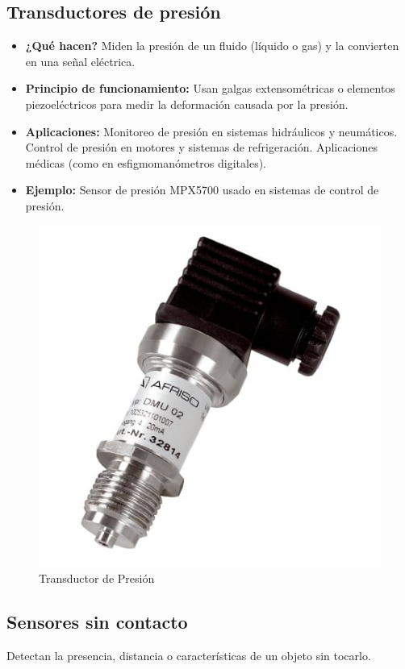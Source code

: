 \subsection*{Transductores de presión}
\begin{itemize}
	\item \textbf{¿Qué hacen?} Miden la presión de un fluido (líquido o gas) y la convierten en una señal eléctrica.
	\item \textbf{Principio de funcionamiento:} Usan galgas extensométricas o elementos piezoeléctricos para medir la deformación causada por la presión.
	\item \textbf{Aplicaciones:} Monitoreo de presión en sistemas hidráulicos y neumáticos.
	Control de presión en motores y sistemas de refrigeración.
	Aplicaciones médicas (como en esfigmomanómetros digitales).
	\item \textbf{Ejemplo:} Sensor de presión MPX5700 usado en sistemas de control de presión.
	\cite{universalrobots_sensores_robótica}
\end{itemize}
\begin{figure}[h]
	\centering
	\includegraphics[width=0.2\linewidth]{img/transductor de presion}
	\caption{Transductor de Presión}
	\label{fig:transductor de presion}
\end{figure}
\subsection{Sensores sin contacto}
Detectan la presencia, distancia o características de un objeto sin tocarlo.

